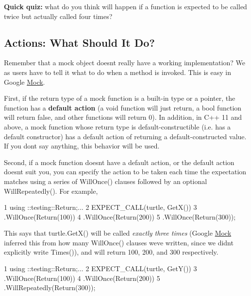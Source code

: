 {\bfseries Quick quiz\+:} what do you think will happen if a function is expected to be called twice but actually called four times?

\subsection*{Actions\+: What Should It Do?}

Remember that a mock object doesn\textquotesingle{}t really have a working implementation? We as users have to tell it what to do when a method is invoked. This is easy in Google \hyperlink{class_mock}{Mock}.

First, if the return type of a mock function is a built-\/in type or a pointer, the function has a {\bfseries default action} (a {\ttfamily void} function will just return, a {\ttfamily bool} function will return {\ttfamily false}, and other functions will return 0). In addition, in C++ 11 and above, a mock function whose return type is default-\/constructible (i.\+e. has a default constructor) has a default action of returning a default-\/constructed value. If you don\textquotesingle{}t say anything, this behavior will be used.

Second, if a mock function doesn\textquotesingle{}t have a default action, or the default action doesn\textquotesingle{}t suit you, you can specify the action to be taken each time the expectation matches using a series of {\ttfamily Will\+Once()} clauses followed by an optional {\ttfamily Will\+Repeatedly()}. For example,


\begin{DoxyCode}
1 using ::testing::Return;...
2 EXPECT\_CALL(turtle, GetX())
3     .WillOnce(Return(100))
4     .WillOnce(Return(200))
5     .WillOnce(Return(300));
\end{DoxyCode}


This says that {\ttfamily turtle.\+Get\+X()} will be called {\itshape exactly three times} (Google \hyperlink{class_mock}{Mock} inferred this from how many {\ttfamily Will\+Once()} clauses we\textquotesingle{}ve written, since we didn\textquotesingle{}t explicitly write {\ttfamily Times()}), and will return 100, 200, and 300 respectively.


\begin{DoxyCode}
1 using ::testing::Return;...
2 EXPECT\_CALL(turtle, GetY())
3     .WillOnce(Return(100))
4     .WillOnce(Return(200))
5     .WillRepeatedly(Return(300));
\end{DoxyCode}


